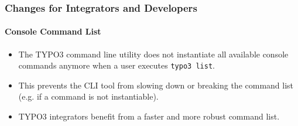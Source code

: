%

\begin{frame}[fragile]
	\frametitle{Changes for Integrators and Developers}
	\framesubtitle{Console Command List}

	\begin{itemize}
		\item The TYPO3 command line utility does not instantiate all available
			console commands anymore when a user executes \texttt{typo3 list}.
		\item This prevents the CLI tool from slowing down or breaking the
			command list (e.g. if a command is not instantiable).
		\item TYPO3 integrators benefit from a faster and more robust command list.
	\end{itemize}

\end{frame}

